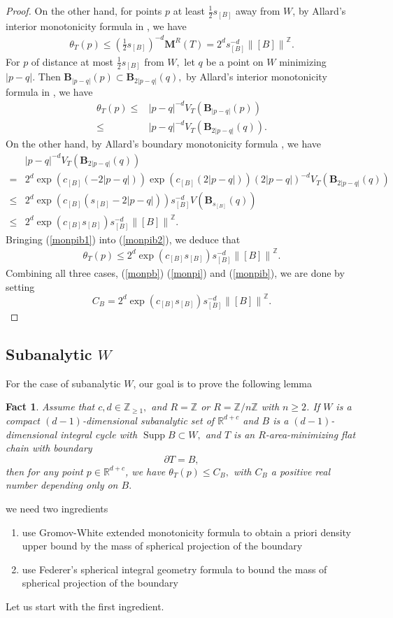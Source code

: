 \documentclass[11pt,a4paper]{amsart}
\numberwithin{equation}{section}
\newcommand{\supp}{\operatorname{Supp}}
\newcommand{\ta}{\theta}
\newcommand{\ms}{\mathbf{M}}
\newcommand{\s}{\subset}
\newcommand{\no}[1]{\left\lVert#1\right\rVert}
\newcommand{\pd}{\partial}
\newcommand{\R}{\mathbb{R}}
\newcommand{\Z}{\mathbb{Z}}
\theoremstyle{plain}
\newtheorem{fact}{Fact}[subsection]
\theoremstyle{definition}
\numberwithin{equation}{subsection}
\begin{document}
\begin{proof}
	On the other hand, for points $p$ at least $\frac{1}{2}s_{[B]}$ away from $ W$, by Allard's interior monotonicity formula in \cite[(2) Corollary of Section 5.1]{WA}, we have
	\begin{align}\label{monpi}
		\ta_T(p)\le \left(\frac{1}{2}s_{[B]}\right)^{-d}\ms^R(T)=2^ds_{[B]}^{-d}\no{[B]}^{\Z}.
	\end{align}
	For $p$ of distance at most $\frac{1}{2}s_{[B]}$ from $ W,$ let $q$ be a point on $ W$ minimizing $|p-q|.$ Then $\mathbf{B}_{|p-q|}(p)\s \mathbf{B}_{2|p-q|}(q),$ by Allard's interior monotonicity formula in \cite[(2) Corollary of Section 5.1]{WA}, we have
	\begin{align}
		\ta_T(p)\le& |p-q|^{-d}V_T(\mathbf{B}_{|p-q|}(p))\\\le& |p-q|^{-d}V_T(\mathbf{B}_{2|p-q|}(q))\label{monpib1}.
	\end{align}On the other hand, by Allard's boundary monotonicity formula \cite[(2) Theorem of Section 3.4]{WAb}, we have
	\begin{align}
		&|p-q|^{-d}V_T(\mathbf{B}_{2|p-q|}(q))\\=&2^d\exp(c_{[B]}(-2|p-q|))\exp(c_{[B]}(2|p-q|))(2|p-q|)^{-d}V_T(\mathbf{B}_{2|p-q|}(q))\\\le& 2^d\exp(c_{[B]}(s_{[B]}-2|p-q|))s_{[B]}^{-d}V(\mathbf{B}_{s_{[B]}}(q))\\\le&2^d\exp(c_{[B]}s_{[B]})s_{[B]}^{-d}\no{[B]}^{\Z}.\label{monpib2}
	\end{align}
	Bringing (\ref{monpib1}) into (\ref{monpib2}), we deduce that
	\begin{align}\label{monpib}
		\ta_T(p)\le 2^d\exp(c_{[B]}s_{[B]})s_{[B]}^{-d}\no{[B]}^{\Z}.
	\end{align}
	Combining all three cases, (\ref{monpb}) (\ref{monpi}) and (\ref{monpib}), we are done by setting $$C_B=2^d\exp(c_{[B]}s_{[B]})s_{[B]}^{-d}\no{[B]}^{\Z}.$$
\end{proof}	
\subsection{Subanalytic $W$}\label{secsubw}
For the case of subanalytic $W$, our goal is to prove the following lemma
\begin{fact}\label{fctsubw}Assume that $c,d\in\Z_{\ge1},$ and $R=\Z$ or $R=\Z/n\Z$ with $n\ge 2$. 
	If $W$ is a compact $(d-1)$-dimensional subanalytic set of $\R^{d+c}$ and $B$ is a $(d-1)$-dimensional integral cycle with $\supp B\s W,$ and $T$ is an $R$-area-minimizing flat chain with boundary $$\pd T=B,$$ then for any point $p\in\R^{d+c}$, we have $\theta_T(p)\le C_{B},$ with $C_{B}$ a positive real number depending only on $B.$
\end{fact}we need two ingredients
\begin{enumerate}
	\item use Gromov-White extended monotonicity formula to obtain a priori density upper bound by the mass of spherical projection of the boundary
	\item use Federer's spherical integral geometry formula to bound the mass of spherical projection of the boundary
\end{enumerate}
Let us start with the first ingredient.
\end{document}
